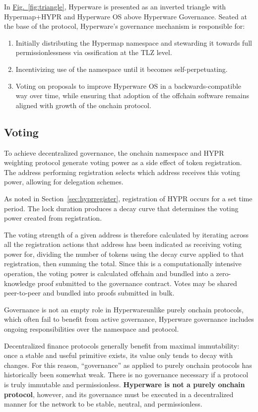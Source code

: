 \documentclass[runningheads]{llncs}
\begin{document}
In \hyperref[fig:triangle]{Fig.~\ref{fig:triangle}}, Hyperware is presented as an inverted triangle with Hypermap+HYPR and Hyperware OS above Hyperware Governance.
Seated at the base of the protocol, Hyperware's governance mechanism is responsible for:
\begin{enumerate}
    \item Initially distributing the Hypermap namespace and stewarding it towards full permissionlessness via ossification at the TLZ level.
    \item Incentivizing use of the namespace until it becomes self-perpetuating.
    \item Voting on proposals to improve Hyperware OS in a backwards-compatible way over time, while ensuring that adoption of the offchain software remains aligned with growth of the onchain protocol.
\end{enumerate}

\subsection{Voting}
\label{sec:voting}

To achieve decentralized governance, the onchain namespace and HYPR weighting protocol generate voting power as a side effect of token registration.
The address performing registration selects which address receives this voting power, allowing for delegation schemes.

As noted in Section~\ref{sec:hyprregister}, registration of HYPR occurs for a set time period.
The lock duration produces a decay curve that determines the voting power created from registration.

The voting strength of a given address is therefore calculated by iterating across all the registration actions that address has been indicated as receiving voting power for, dividing the number of tokens using the decay curve applied to that registration, then summing the total.
Since this is a computationally intensive operation, the voting power is calculated offchain and bundled into a zero-knowledge proof submitted to the governance contract.
Votes may be shared peer-to-peer and bundled into proofs submitted in bulk.

Governance is not an empty role in Hyperware\textemdash unlike purely onchain protocols, which often fail to benefit from active governance, Hyperware governance includes ongoing responsibilities over the namespace and protocol.

Decentralized finance protocols generally benefit from maximal immutability: once a stable and useful primitive exists, its value only tends to decay with changes.
For this reason, ``governance'' as applied to purely onchain protocols has historically been somewhat weak.
There is no governance necessary if a protocol is truly immutable and permissionless. \textbf{Hyperware is not a purely onchain protocol}, however, and its governance must be executed in a decentralized manner for the network to be stable, neutral, and permissionless.
\end{document}
